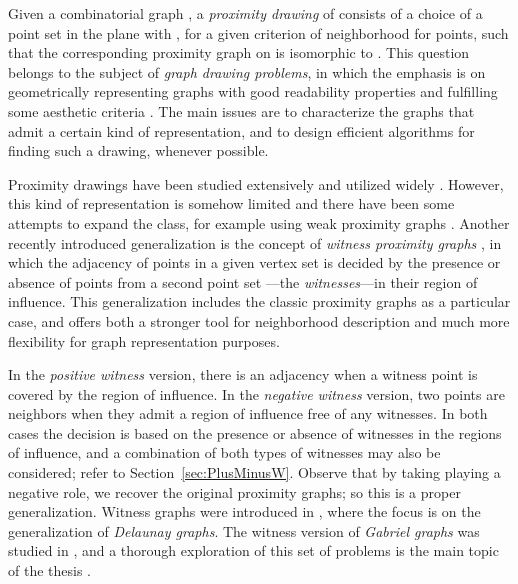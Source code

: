 \documentclass{llncs}
\begin{document}
Given a combinatorial graph , a \emph{proximity drawing} of  consists of
a choice of a point set  in the plane with , for a given criterion of neighborhood
for points, such that the corresponding proximity graph on  is
isomorphic to .  This question
belongs to the subject of \emph{graph drawing problems}, in which the emphasis is on geometrically representing graphs
with good readability properties and fulfilling some aesthetic criteria \cite{BETT98}. The main issues are to characterize the graphs that admit a certain kind of representation, and to design efficient algorithms for finding such a drawing,
whenever possible.

Proximity drawings have been studied extensively and utilized widely \cite{BLL94,Li08}. However, this  kind of representation is
somehow limited and there have been some attempts to expand the class, for example using weak proximity graphs \cite{BLW06}.
Another recently introduced generalization is the
concept of \emph{witness proximity graphs} \cite{ADH,ADH08}, in which the adjacency of points in a
given vertex set  is decided by the presence or
absence of points from a second
point set ---the \emph{witnesses}---in their region of
influence. This generalization includes the classic proximity graphs
as a particular case,
and offers both a stronger tool for neighborhood description and much more flexibility for graph representation purposes.

In the \emph{positive witness} version, there is an adjacency when
a witness point is covered by the region of influence.  In the \emph{negative witness} version,
two points are neighbors when they admit a region of influence free of any witnesses.
In both cases the decision is based on the presence or absence of witnesses
in the regions of influence, and a combination of both types of
witnesses may also be considered; refer to Section~\ref{sec:PlusMinusW}. Observe that by taking  playing a negative role, we recover the original proximity
graphs; so this is a proper generalization.
Witness graphs were introduced in \cite{ADH}, where the focus is on the generalization of \emph{Delaunay graphs}. The witness version
of \emph{Gabriel graphs} was studied in \cite{ADH08}, and a thorough exploration of this set of problems is the main topic
of the thesis \cite{thesis}.
\end{document}
